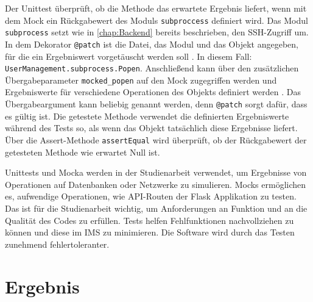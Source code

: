 \documentclass[a4paper,titlepage,halfparskip,12pt]{scrreprt}
\begin{document}
\begin{onehalfspacing}
Der Unittest überprüft, ob die Methode das erwartete Ergebnis liefert, wenn mit dem Mock ein Rückgabewert des Moduls \texttt{subproccess} definiert wird. Das Modul \texttt{subprocess} setzt wie in \autoref{chap:Backend} bereits beschrieben, den \acs{SSH}-Zugriff um. In dem Dekorator \texttt{@patch} ist die Datei, das Modul und das Objekt angegeben, für die ein Ergebniswert vorgetäuscht werden soll \cite{hubertz2016softwaretests}. In diesem Fall: \texttt{UserManagement.subprocess.Popen}. Anschließend kann über den zusätzlichen Übergabeparameter \texttt{mocked\_popen} auf den Mock zugegriffen werden und Ergebniswerte für verschiedene Operationen des Objekts definiert werden \cite{hubertz2016softwaretests}. Das Übergabeargument kann beliebig genannt werden, denn \texttt{@patch} sorgt dafür, dass es gültig ist. Die getestete Methode verwendet die definierten Ergebniswerte während des Tests so, als wenn das Objekt tatsächlich diese Ergebnisse liefert. Über die Assert-Methode \texttt{assertEqual} wird überprüft, ob der Rückgabewert der getesteten Methode wie erwartet Null ist.

\pagebreak

Unittests und Mocka werden in der Studienarbeit verwendet, um Ergebnisse von Operationen auf Datenbanken oder Netzwerke zu simulieren. Mocks ermöglichen es, aufwendige Operationen, wie \acs{API}-Routen der Flask Applikation zu testen. Das ist für die Studienarbeit wichtig, um Anforderungen an Funktion und an die Qualität des Codes zu erfüllen. Tests helfen Fehlfunktionen nachvollziehen zu können und diese im \acs{IMS} zu minimieren. Die Software wird durch das Testen zunehmend fehlertoleranter.

\pagebreak

\chapter{Ergebnis}
\label{chap:Ergebnis}


\end{onehalfspacing}
\end{document}
